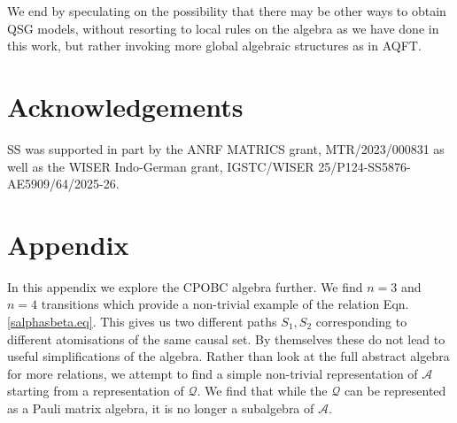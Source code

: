 \documentclass[11pt]{article}
\newcommand{\cA}{\mathcal A}
\newcommand{\cQ}{\mathcal Q}
\begin{document}
We end by speculating on the possibility that 
there may be  other ways to obtain QSG models,  without resorting to
local rules on the algebra as we have done in this work, but rather
invoking more global algebraic structures as in AQFT.  


\section{Acknowledgements} 
SS was supported in part by the ANRF MATRICS grant,
MTR/2023/000831 as well as the WISER Indo-German grant,  IGSTC/WISER
25/P124-SS5876-AE5909/64/2025-26. 

\appendix
\section*{Appendix}
\label{appendix.app}

In this appendix we explore the CPOBC algebra further. We find $n=3$ and $n=4$ transitions which provide a non-trivial
example of the relation Eqn. \eqref{salphasbeta.eq}. This gives us 
two different paths $S_1, S_2$ corresponding to different
atomisations  of the same causal
set. By themselves these do not lead to useful simplifications of the
algebra. Rather than look at the full abstract algebra for more
relations, we attempt to find a simple non-trivial representation
of $\cA$ starting from a representation of $\cQ$. We find that while
the $\cQ$ can be represented as a Pauli matrix algebra, it is no
longer a subalgebra of $\cA$.  
\end{document}

